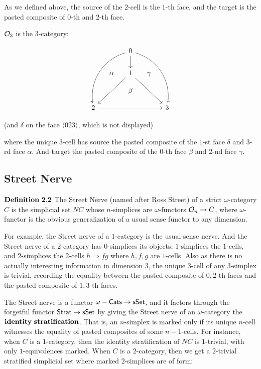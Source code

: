 \documentclass[11pt]{article}
\begin{document}
As we defined above, the source of the $2$-cell is the $1$-th face, and the target is the pasted composite of $0$-th and $2$-th face.

${{\cal O}_3}$ is the $3$-category:

\begin{equation*}
\begin{tikzcd}[column sep=small, row sep=small]
& & 0 \arrow{dd}{}\arrow[swap,bend right=40]{ddddll}{} \arrow[bend left=40]{ddddrr}{} \\
\\
& \alpha & 1\arrow{ddll}{} \arrow{ddrr}{} & \gamma \\
& & \beta \\
2 \arrow{rrrr}{} & & & & 3
\end{tikzcd}
\end{equation*}

(and $\delta$ on the face $\langle 023\rangle$, which is not displayed)

where the unique $3$-cell has source the pasted composite of the $1$-st face $\delta$ and $3$-rd face $\alpha$. And target the pasted composite of the $0$-th face $\beta$ and $2$-nd face $\gamma$.


\subsection{Street Nerve}

$\bf Definition \ 2.2$ The Street Nerve (named after Ross Street) of a strict $\omega$-category $C$ is the simplicial set $NC$ whose $n$-simplices are $\omega$-functors ${\cal O}_n\to C$, where $\omega$-functor is the obvious generalization of a usual sense functor to any dimension. 

For example, the Street nerve of a $1$-category is the usual-sense nerve. And the Street nerve of a $2$-category has $0$-simplices its objects, $1$-simplices the $1$-cells, and $2$-simplices the $2$-cells $h\Rightarrow fg$ where $h,f,g$ are $1$-cells. Also as there is no actually interesting information in dimension $3$, the unique $3$-cell of any $3$-simplex is trivial, recording the equality between the pasted composite of $0,2$-th faces and the pasted composite of $1,3$-th faces.

The Street nerve is a functor $\omega-{\sf Cats}\to {\sf sSet}$, and it factors through the forgetful functor ${\sf Strat}\to{\sf sSet}$ by giving the Street nerve of an $\omega$-category the $\bf identity \ stratification$. That is, an $n$-simplex is marked only if its unique $n$-cell witnesses the equality of pasted composites of some $n-1$-cells. For instance, when $C$ is a $1$-category, then the identity stratification of $NC$ is $1$-trivial, with only $1$-equivalences marked. When $C$ is a $2$-category, then we get a $2$-trivial stratified simplicial set where marked $2$-simplices are of form:
\end{document}
